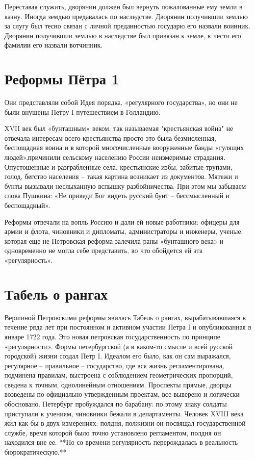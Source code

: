 \documentclass[12pt,a4paper]{article}
\begin{document}
Переставая служить, дворянин должен был вернуть пожалованные ему земли в казну.
Иногда земдью предавалась по наследстве.
Дворянин получившии землью за слугу был тесно связан с личной преданностью государю его назвали воинник.
Дворянин получившии землью в наследстве был привязан к земле, к чести его фамилии его назвали вотчинник.
\section{Реформы Пётра 1}
Они представляли собой Идея порядка, «регулярного государства», но они не были внушены Петру I путешествием в Голландию.

XVII век был «бунташным» веком. так называемая "крестьянская война" не отвечала интересам всего крестьянства просто это была безмисленная, беспощадная воина и в которой многочисленные вооруженные банды «гулящих людей»,причинили сельскому населению России неизмеримые
страдания.
Опустошенные и разграбленные села, крестьянские избы, забитые трупами, голод, бегство населения – такая картина возникает из документов. Мятежи и бунты вызывали неслыханную вспышку разбойничества.  
При этом мы забываем слова Пушкина: «Не приведи Бог видеть русский бунт – бессмысленный и беспощадный».

Реформы отвечали на вопль Россию и дали ей новые
работники: офицеры для армии и флота, чиновники и дипломаты, администраторы и инженеры, ученые.
которая еще не
Петровская реформа залечила раны «бунташного века» и одновременно не могла себе представить, во что обойдется ей эта «регулярность».
\section{Табель о рангах}
Вершиной Петровскими реформы явилась Табель
о рангах, вырабатывавшаяся в течение ряда лет при
постоянном и активном участии Петра I и опубликованная
в январе 1722 года.  
Это новая  петровская государственность по  принципе «регулярности».
Формы петербургской (а в каком-то смысле и всей
русской городской) жизни создал Петр I. Идеалом его было,
как он сам выражался, регулярное – правильное –
государство, где вся жизнь регламентирована, подчинена
правилам, выстроена с соблюдением геометрических
пропорций, сведена к точным, однолинейным отношениям.
Проспекты прямые, дворцы возведены по официально
утвержденным проектам, все выверено и логически
обосновано. Петербург пробуждался по барабану: по этому
знаку солдаты приступали к учениям, чиновники бежали
в департаменты. Человек XVIII  века жил как бы в двух
измерениях: полдня, полжизни он посвящал
государственной службе, время которой было точно
установлено регламентом, полдня он находился вне ее.
**Но со времени регулярность перерождалась в реальность
бюрократическую.**
\end{document}
